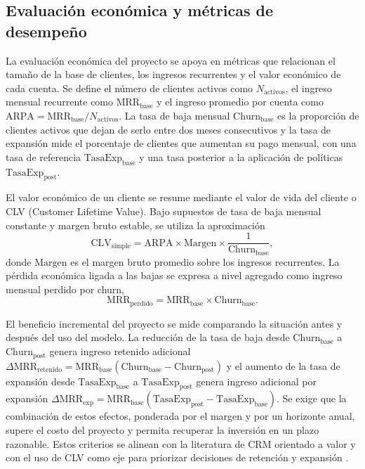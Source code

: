\subsection{Evaluación económica y métricas de desempeño}

La evaluación económica del proyecto se apoya en métricas que relacionan el tamaño de la base de clientes, los ingresos recurrentes y el valor económico de cada cuenta. Se define el número de clientes activos como \(N_{\mathrm{activos}}\), el ingreso mensual recurrente como \(\mathrm{MRR}_{\mathrm{base}}\) y el ingreso promedio por cuenta como \(\mathrm{ARPA} = \mathrm{MRR}_{\mathrm{base}} / N_{\mathrm{activos}}\). La tasa de baja mensual \(\mathrm{Churn}_{\mathrm{base}}\) es la proporción de clientes activos que dejan de serlo entre dos meses consecutivos y la tasa de expansión mide el porcentaje de clientes que aumentan su pago mensual, con una tasa de referencia \(\mathrm{TasaExp}_{\mathrm{base}}\) y una tasa posterior a la aplicación de políticas \(\mathrm{TasaExp}_{\mathrm{post}}\).

El valor económico de un cliente se resume mediante el valor de vida del cliente o CLV (Customer Lifetime Value). Bajo supuestos de tasa de baja mensual constante y margen bruto estable, se utiliza la aproximación
\[
\mathrm{CLV}_{\mathrm{simple}} = \mathrm{ARPA} \times \mathrm{Margen} \times \frac{1}{\mathrm{Churn}_{\mathrm{base}}},
\]
donde \(\mathrm{Margen}\) es el margen bruto promedio sobre los ingresos recurrentes. La pérdida económica ligada a las bajas se expresa a nivel agregado como ingreso mensual perdido por churn,
\[
\mathrm{MRR}_{\mathrm{perdido}} = \mathrm{MRR}_{\mathrm{base}} \times \mathrm{Churn}_{\mathrm{base}}.
\]

El beneficio incremental del proyecto se mide comparando la situación antes y después del uso del modelo. La reducción de la tasa de baja desde \(\mathrm{Churn}_{\mathrm{base}}\) a \(\mathrm{Churn}_{\mathrm{post}}\) genera ingreso retenido adicional \(\Delta \mathrm{MRR}_{\mathrm{retenido}} = \mathrm{MRR}_{\mathrm{base}} (\mathrm{Churn}_{\mathrm{base}} - \mathrm{Churn}_{\mathrm{post}})\) y el aumento de la tasa de expansión desde \(\mathrm{TasaExp}_{\mathrm{base}}\) a \(\mathrm{TasaExp}_{\mathrm{post}}\) genera ingreso adicional por expansión \(\Delta \mathrm{MRR}_{\mathrm{exp}} = \mathrm{MRR}_{\mathrm{base}} (\mathrm{TasaExp}_{\mathrm{post}} - \mathrm{TasaExp}_{\mathrm{base}})\). Se exige que la combinación de estos efectos, ponderada por el margen y por un horizonte anual, supere el costo del proyecto y permita recuperar la inversión en un plazo razonable. Estos criterios se alinean con la literatura de CRM orientado a valor y con el uso de CLV como eje para priorizar decisiones de retención y expansión \citep{Kumar2010,Gupta2006}.

